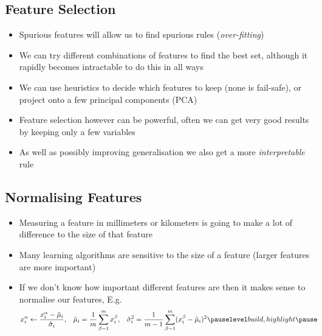 \begin{slide}
\section[-1]{Feature Selection}

\begin{PauseHighLight}
  \begin{itemize}
  \item Spurious features will allow us to find spurious rules
    (\emph{over-fitting})\pause
  \item We can try different combinations of features to find the best
    set, although it rapidly becomes intractable to do this in all
    ways\pause
  \item We can use heuristics to decide which features to keep (none
    is fail-safe), or project onto a few principal components (PCA)\pause
  \item Feature selection however can be powerful, often we can get very
    good results by keeping only a few variables\pause
  \item As well as possibly improving generalisation we also get a more
    \emph{interpretable} rule\pause
  \end{itemize}
\end{PauseHighLight}

\end{slide}


\begin{slide}
\section{Normalising Features}

\begin{PauseHighLight}
  \begin{itemize}
  \item Measuring a feature in millimeters or kilometers is going
    to make a lot of difference to the size of that feature\pause
  \item Many learning algorithms are sensitive to the size of a
    feature (larger features are more important)\pause
  \item If we don't know how important different features are then it
    makes sense to normalise our features\pause, E.g.
    \begin{align*}
      x^\alpha_i &\leftarrow \frac{x^\alpha_i-\hat{\mu}_i}{\hat{\sigma}_i},
      &
      \hat{\mu}_i &= \frac{1}{m} \sum_{\beta=1}^m x_i^\beta,
      &
      \hat{\sigma}_i^2 &= \frac{1}{m-1} \sum_{\beta=1}^m
                       (x_i^\beta-\hat{\mu}_i)^2\pauseb 
    \end{align*}
  \end{itemize}
\end{PauseHighLight}

\end{slide}




